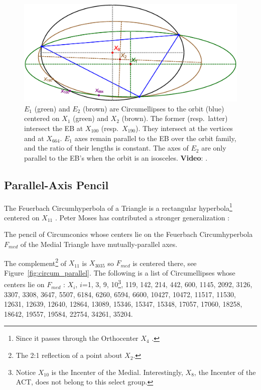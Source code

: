 \begin{figure}
    \centering
    \includegraphics[width=\textwidth]{pics_eps_new/0091_e1e2.eps}
    \caption{$E_1$ (green) and $E_2$ (brown) are Circumellipses to the orbit (blue) centered on $X_1$ (green) and $X_2$ (brown). The former (resp.~latter) intersect the EB at $X_{100}$ (resp.~$X_{190}$). They intersect at the vertices and at $X_{664}$. $E_1$ axes remain parallel to the EB over the orbit family, and the ratio of their lengths is constant. The axes of $E_2$ are only parallel to the EB's when the orbit is an isosceles. \textbf{Video}: \cite[PL\#08]{reznik2020-playlist-circum}.}
    \label{fig:circumX1X2}
\end{figure}

\subsection{Parallel-Axis Pencil}

The Feuerbach Circumhyperbola of a Triangle is a rectangular hyperbola\footnote{Since it passes through the Orthocenter $X_4$ \cite{mw}.} centered on $X_{11}$ \cite{mw}.
Peter Moses has contributed a stronger generalization \cite{moses2020-private-circumconic}:

\begin{remark}
The pencil of Circumconics whose centers lie on the Feuerbach Circumhyperbola $F_{med}$ of the Medial Triangle have mutually-parallel axes. 
\end{remark}

The complement\footnote{The 2:1 reflection of a point about $X_2$.} of $X_{11}$ is $X_{3035}$ \cite{etc} so $F_{med}$ is centered there, see Figure~\ref{fig:circum_parallel}. The following is a list of Circumellipses whose centers lie on $F_{med}$ \cite{moses2020-private-circumconic}: $X_i$,  $i$=1, 3, 9, 10\footnote{Notice $X_{10}$ is the Incenter of the Medial. Interestingly, $X_8$, the Incenter of the ACT, does not belong to this select group.}, 119, 142, 214, 442, 600, 1145, 2092, 3126, 3307, 3308, 3647, 5507, 6184, 6260, 6594, 6600, 10427, 10472, 11517, 11530, 12631, 12639, 12640, 12864, 13089, 15346, 15347, 15348, 17057, 17060, 18258, 18642, 19557, 19584, 22754, 34261, 35204.

